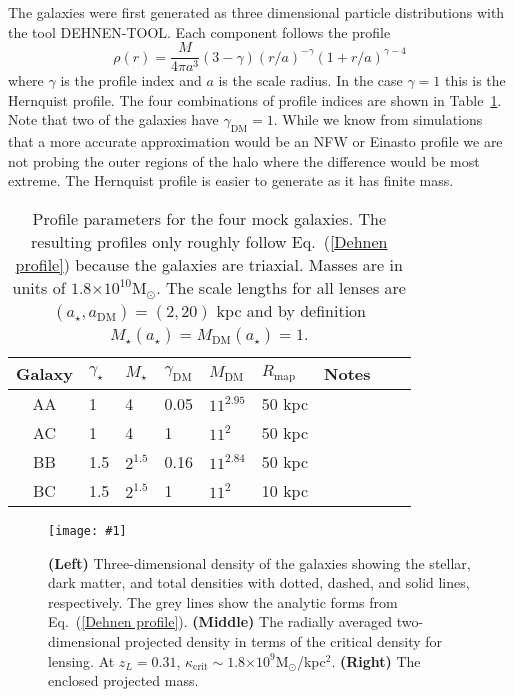 \documentclass[onecolumn,galley]{mn2e}
\newcommand{\Rmap}{\ensuremath{R_\mathrm{map}}}
\newcommand{\Msun}{\ensuremath{\mathrm{M}_\odot}}
\newcommand{\tabref}[1] {Table~\ref{#1}}
\newcommand{\eqnref}[1] {Eq.~(\ref{#1})}
\newcommand{\e}[1]{\ensuremath{\times 10^{#1}}}
\newcommand\plotone[1]{%
 \centering
 \leavevmode
 \texttt{[image: \#1]}%
}%
\begin{document}
The galaxies were
first generated as three dimensional particle distributions with the
tool DEHNEN-TOOL. Each component follows the profile
\begin{equation}
\rho(r) = \frac{M}{4\pi a^3}(3-\gamma){(r/a)^{-\gamma}(1 + r/a)^{\gamma-4}}
\label{Dehnen profile}
\end{equation}
where $\gamma$ is the profile index and $a$ is the scale radius.  In the
case $\gamma=1$ this is the Hernquist profile.  The four combinations of
profile indices are shown in \tabref{mock galaxy params}.  Note that two of
the galaxies have $\gamma_\mathrm{DM}=1$. While we know from simulations that a
more accurate approximation would be an NFW or Einasto profile we are not
probing the outer regions of the halo where the difference would be most
extreme.  The Hernquist profile is easier to generate as it has finite mass.

\begin{table}
\begin{tabular}{cllllllll}
Galaxy & $\gamma_\star$ & $M_\star$ & $\gamma_\mathrm{DM}$ & $M_\mathrm{DM}$ & $\Rmap$ & Notes\\
\hline
AA & 1 & 4 & 0.05 & $11^{2.95}$ & 50 kpc & \\
AC & 1 & 4 & 1 & $11^2$ & 50 kpc & \\
BB & 1.5 & $2^{1.5}$ & 0.16 & $11^{2.84}$ & 50 kpc & \\
BC & 1.5 & $2^{1.5}$ & 1 & $11^2$ & 10 kpc & 
\end{tabular}
\caption{Profile parameters for the four mock galaxies. The resulting profiles only roughly follow
\eqnref{Dehnen profile} because the galaxies are triaxial. Masses are in units of $1.8\e{10}\Msun$. The scale lengths for
all lenses are $(a_\star,a_\mathrm{DM})=(2,20)$ kpc and by definition
$M_\star(a_\star) = M_\mathrm{DM}(a_\star) = 1$.}
\label{mock galaxy params}
\end{table}


\begin{figure}
\plotone{cmp_simulations.pdf}
\caption{
\textbf{(Left)} 
Three-dimensional density of the galaxies showing the stellar, dark matter,
and total densities with dotted, dashed, and solid lines, respectively. The
grey lines show the analytic forms from \eqnref{Dehnen profile}. 
\textbf{(Middle)} 
The radially averaged two-dimensional projected density in terms of the
critical density for lensing. At $z_L=0.31$, $\kappa_\mathrm{crit}\sim 1.8\e{9}$\Msun/kpc$^2$.
\textbf{(Right)}
The enclosed projected mass.
}
\label{mock galaxies}
\end{figure}
\end{document}
